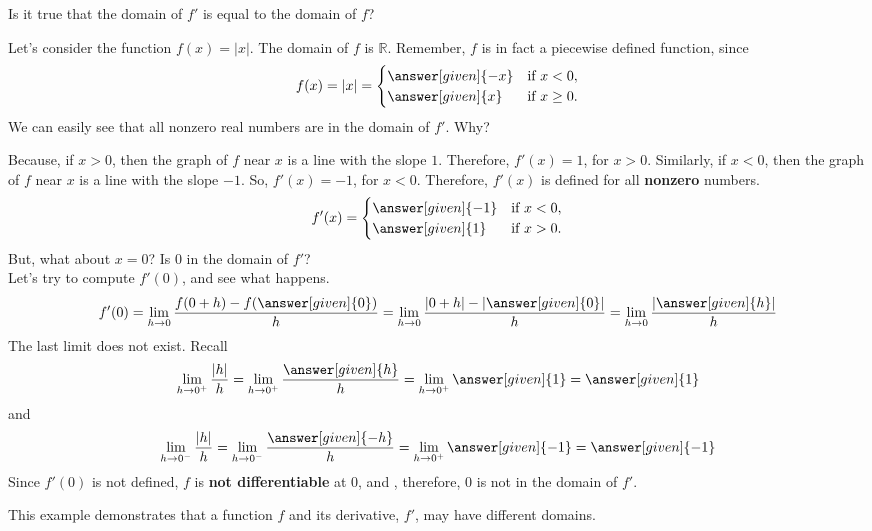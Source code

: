 \documentclass{ximera}
\begin{document}
\begin{question}
  Is it true that the domain of $f'$ is equal to the domain of $f$?
  \begin{prompt}
  \begin{multipleChoice}
  \end{multipleChoice}
  \begin{feedback}
   Let's consider the function $f(x)=|x|$. The domain of $f$ is  $\mathbb R$.
   Remember, $f$ is in fact a piecewise defined function, since
   \[
   f(x)=|x| =
   \begin{cases}
     \answer[given]{-x} &\text{if $x<0$},\\
     \answer[given]{x} &\text{if $x\ge 0$}.
   \end{cases}
   \]
   We can easily see that all nonzero real numbers are in the domain
   of $f'$. Why?

   Because, if $x>0$, then the graph of $f$ near $x$ is a line with
   the slope $1$. Therefore, $f'(x)=1$, for $x>0$.  Similarly, if
   $x<0$, then the graph of $f$ near $x$ is a line with the slope
   $-1$. So, $f'(x)=-1$, for $x<0$.  Therefore, $f'(x)$ is defined for
   all \textbf{nonzero} numbers.
   \[
   f'(x) =
   \begin{cases}
     \answer[given]{ -1} &\text{if $x<0$},\\
     \answer[given]{1} &\text{if $x> 0$}.
   \end{cases}
   \]
But, what about $x=0$? Is 0 in the domain of $f'$?\\
Let's try to compute $f'(0)$, and see what happens.
\[
f'(0)=  \lim_{h\to 0} \dfrac{f(0+h) - f(\answer[given]{0})}{h}= \lim_{h\to 0} \dfrac{|0+h|-|\answer[given]{0}| }{h}
= \lim_{h\to 0} \dfrac{|\answer[given]{h}| }{h}
\]
The last limit does not exist. Recall
\[
\lim_{h\to 0^+} \dfrac{|h| }{h}= \lim_{h\to 0^+} \dfrac{\answer[given]{h} }{h}=\lim_{h\to 0^+} \answer[given]{1}=\answer[given]{1}
\]
and
\[
\lim_{h\to 0^-} \dfrac{|h| }{h}= \lim_{h\to 0^-} \dfrac{\answer[given]{-h} }{h}=\lim_{h\to 0^+} \answer[given]{-1}=\answer[given]{-1}
\]
Since $f'(0)$ is not defined, $f$ is \textbf{not differentiable} at $0$, and , therefore,  $0$ is not in the domain of $f'$.


This example demonstrates that a function $f$ and its derivative, $f'$, may have different domains.
  \end{feedback}
  \end{prompt}
\end{question}
\end{document}
